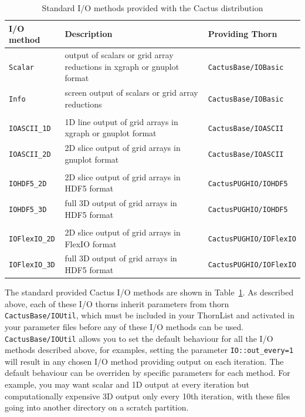 \documentclass{article}
\begin{document}
\begin{table}
\label{one}
\begin{tabular}{|l|p{4.5cm}|l|}
  \hline
  {\bf I/O method} & {\bf Description} & {\bf Providing Thorn}\\
  \hline
  {\tt Scalar} & 
  output of scalars or grid array reductions in xgraph or gnuplot format & 
  {\tt CactusBase/IOBasic}
\\
  {\tt Info}      & 
  screen output of scalars or grid array reductions & 
  {\tt CactusBase/IOBasic}
\\
&&\\
  {\tt IOASCII\_1D} & 
  1D line output of grid arrays in xgraph or gnuplot format & 
  {\tt CactusBase/IOASCII}
\\
  {\tt IOASCII\_2D} & 
  2D slice output of grid arrays in gnuplot format & 
  {\tt CactusBase/IOASCII}
\\
&&\\
  {\tt IOHDF5\_2D} & 
  2D slice output of grid arrays in HDF5 format & 
  {\tt CactusPUGHIO/IOHDF5}
\\
  {\tt IOHDF5\_3D} & 
  full 3D output of grid arrays in HDF5 format & 
  {\tt CactusPUGHIO/IOHDF5}
\\
&&\\
  {\tt IOFlexIO\_2D} & 
  2D slice output of grid arrays in FlexIO format & 
  {\tt CactusPUGHIO/IOFlexIO}
\\
  {\tt IOFlexIO\_3D} & 
  full 3D output of grid arrays in HDF5 format & 
  {\tt CactusPUGHIO/IOFlexIO}
\\
  \hline
\end{tabular}
\caption{Standard I/O methods provided with the Cactus distribution}
\end{table}

The standard provided Cactus I/O methods are shown in Table~\ref{one}.
As described above, each of these I/O thorns inherit parameters from thorn 
{\tt CactusBase/IOUtil}, which must be included in your ThornList
and activated in your parameter files before any of these I/O methods 
can be used. {\tt CactusBase/IOUtil} allows you to set the default 
behaviour for all the I/O methods described above, for examples, setting
the parameter {\tt IO::out\_every=1} will result in any chosen I/O method
providing output on each iteration. The default behaviour can be overriden
by specific parameters for each method.
For example, you may want scalar and 1D output at every iteration
but computationally expensive 3D output only every 10th iteration, 
with these files going into another directory on a scratch partition.
\end{document}
